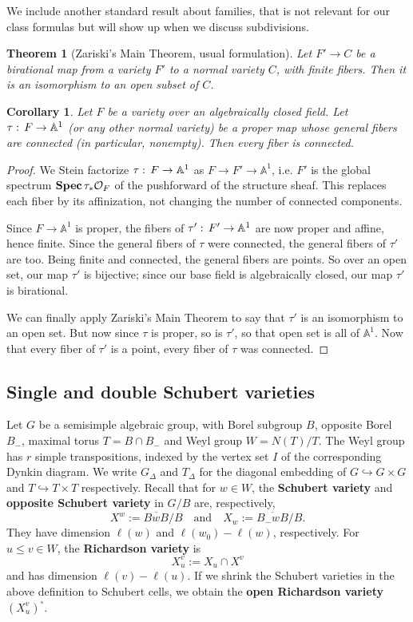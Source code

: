 \documentclass[10pt,a4paper]{amsart}
\newtheorem{theorem}[Thm]{Theorem}
\newtheorem{corollary}[Thm]{Corollary}
\newcommand\defn[1]{{\bf #1}}
\def\AA{{\mathbb A }}
\newcommand\calO{{\mathcal O}}
\renewcommand\AA{{\mathbb A}}
\renewcommand{\colon}{\mathrel{:}}
\renewcommand{\colon}{:\mkern\thinmuskip}
\begin{document}
We include another standard result about families, that is not relevant
for our class formulas but will show up when we discuss subdivisions.

\begin{theorem}[Zariski's Main Theorem, usual formulation]
  Let $F' \to C$ be a birational map from a variety $F'$ to a normal
  variety $C$, with finite fibers. Then it is an isomorphism to an open
  subset of $C$.
\end{theorem}

\begin{corollary}\label{cor:ZMT}
  Let $F$ be a variety over an algebraically closed field.
  Let $\tau\colon F \to \AA^1$ (or any other normal variety)
  be a proper map whose general fibers are
  connected (in particular, nonempty). Then {\em every} fiber is connected.
\end{corollary}

\begin{proof}
  We Stein factorize $\tau\colon F\to \AA^1$ as $F \to F' \to \AA^1$, i.e.
  $F'$ is the global spectrum ${\bf Spec}\, \tau_* \calO_F$ of the
  pushforward of the structure sheaf. This replaces each fiber by
  its affinization, not changing the number of connected components.

  Since $F\to \AA^1$ is proper,
  the fibers of $\tau'\colon F' \to \AA^1$ are now proper and affine,
  hence finite. Since the general fibers of $\tau$ were connected,
  the general fibers of $\tau'$ are too. Being finite and connected,
  the general fibers are points. So over an open set, our map $\tau'$
  is bijective; since our base field is algebraically closed,
  our map $\tau'$ is birational.

  We can finally apply Zariski's Main Theorem to say that $\tau'$ is
  an isomorphism to an open set. But now since $\tau$ is proper, so is
  $\tau'$, so that open set is all of $\AA^1$. Now that every fiber of
  $\tau'$ is a point, every fiber of $\tau$ was connected.
\end{proof}

\subsection{Single and double Schubert varieties} 

Let $G$ be a semisimple algebraic group, with Borel subgroup $B$, opposite Borel $B_-$, maximal torus $T =B \cap B_-$ and Weyl group $W=N(T)/T$. The Weyl group has $r$ simple transpositions, indexed by the vertex set $I$ of the corresponding Dynkin diagram. We write $G_{\Delta}$ and $T_{\Delta}$ for the diagonal embedding of $G \hookrightarrow G \times G$ and $T \hookrightarrow T \times T$ respectively.
 Recall that for $ w \in W$, the \defn{Schubert variety} and \defn{opposite Schubert variety} in $G/B$ are, respectively, 
\[X^w := \overline{BwB}/B \quad \text{and} \quad X_w := \overline{B_- w B}/B.\]
They have dimension $\ell(w)$ and $\ell(w_0)-\ell(w)$, respectively. For $u\leq  v \in W$, the \defn{Richardson variety} is 
\[X^v_u:= X_u \cap X^v\]
and has dimension $\ell(v)- \ell(u)$. If we shrink the Schubert varieties in the above definition to Schubert cells, we obtain the \defn{open Richardson variety} $(X^v_u)^\circ$.
\end{document}
